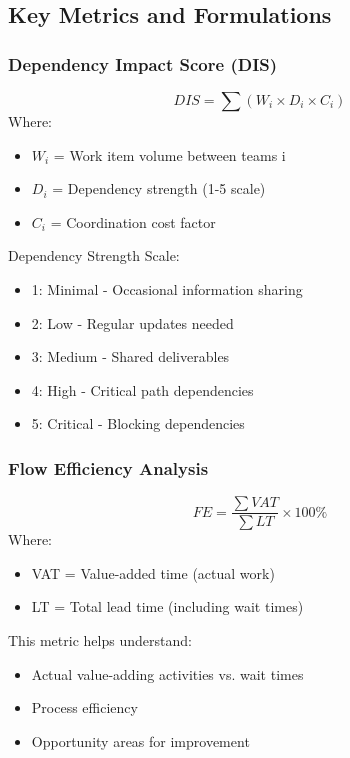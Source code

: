 \documentclass[12pt,a4paper]{article}
\newenvironment{definition}[1]
{\begin{mdframed}[style=definitionstyle,frametitle={Definition: #1}]}
{\end{mdframed}}
\newenvironment{explanation}
{\begin{mdframed}[style=explanationstyle,frametitle={Explanation}]}
{\end{mdframed}}
\newenvironment{observation}
{\begin{mdframed}[style=observationstyle,frametitle={Observation}]}
{\end{mdframed}}
\begin{document}
\subsection{Key Metrics and Formulations}

\subsubsection{Dependency Impact Score (DIS)}

\begin{definition}{Dependency Impact Score}
\[
DIS = \sum(W_i \times D_i \times C_i)
\]
Where:
\begin{itemize}
    \item $W_i$ = Work item volume between teams i
    \item $D_i$ = Dependency strength (1-5 scale)
    \item $C_i$ = Coordination cost factor
\end{itemize}
\end{definition}

\begin{observation}
Dependency Strength Scale:
\begin{itemize}
    \item 1: Minimal - Occasional information sharing
    \item 2: Low - Regular updates needed
    \item 3: Medium - Shared deliverables
    \item 4: High - Critical path dependencies
    \item 5: Critical - Blocking dependencies
\end{itemize}
\end{observation}

\subsubsection{Flow Efficiency Analysis}

\begin{definition}{Flow Efficiency}
\[
FE = \frac{\sum VAT}{\sum LT} \times 100\%
\]
Where:
\begin{itemize}
    \item VAT = Value-added time (actual work)
    \item LT = Total lead time (including wait times)
\end{itemize}
\end{definition}

\begin{explanation}
This metric helps understand:
\begin{itemize}
    \item Actual value-adding activities vs. wait times
    \item Process efficiency
    \item Opportunity areas for improvement
\end{itemize}
\end{explanation}
\end{document}
